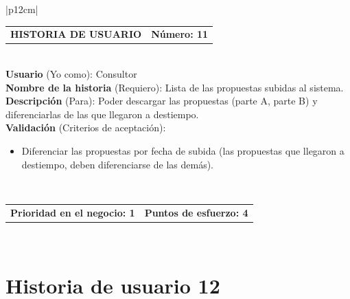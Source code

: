 \documentclass[11pt,letterpaper]{report}
\begin{document}
	\begin{center}	
		\begin{tabular}{|p{12cm}|}
			\hline
			\begin{tabular}{c|c}
				\textbf{HISTORIA DE USUARIO} & \textbf{Número: 11} \\
			\end{tabular} \\ \hline
			\textbf{Usuario} (Yo como): Consultor \\ \hline
			\textbf{Nombre de la historia} (Requiero): Lista de las propuestas subidas al sistema. \\ \hline
			\textbf{Descripción} (Para): Poder descargar las propuestas (parte A, parte B) y diferenciarlas de las que llegaron a destiempo. \\ \hline
			\textbf{Validación} (Criterios de aceptación): \\
			\begin{minipage}{12cm}
				\begin{itemize}
					\item Diferenciar las propuestas por fecha de subida (las propuestas que llegaron a destiempo, deben diferenciarse de las demás).
				\end{itemize}
			\end{minipage} \\ \hline
			\begin{tabular}{c|c}
				\textbf{Prioridad en el negocio: 1} & \textbf{Puntos de esfuerzo: 4} \\
			\end{tabular} \\ \hline
		\end{tabular}
	\end{center}
	
	\section{Historia de usuario 12}
	
\end{document}

